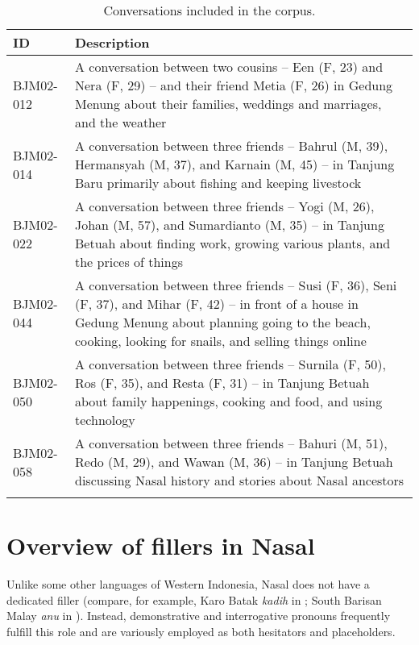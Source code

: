 \documentclass[output=paper,colorlinks,citecolor=brown
\ChapterDOI{10.5281/zenodo.15697585}
]{langscibook}
\begin{document}
\begin{table}
    \caption{Conversations included in the corpus.}
    \label{tab:billings:corpus}
    \begin{tabularx}{1\textwidth}{l X}
        \lsptoprule
        ID         & Description \\
        \midrule
        BJM02-012
        & A conversation between two cousins – Een (F, 23) and Nera (F, 29) – and their friend Metia (F, 26) in Gedung Menung about their families, weddings and marriages, and the weather \\
        BJM02-014
        & A conversation between three friends – Bahrul (M, 39), Hermansyah (M, 37), and Karnain (M, 45) – in Tanjung Baru primarily about fishing and keeping livestock \\
        BJM02-022
        & A conversation between three friends – Yogi (M, 26), Johan (M, 57), and Sumardianto (M, 35) – in Tanjung Betuah about finding work, growing various plants, and the prices of things \\
        BJM02-044
        & A conversation between three friends – Susi (F, 36), Seni (F, 37), and Mihar (F,  42) – in front of a house in Gedung Menung about planning going to the beach, cooking, looking for snails, and selling things online  \\
        BJM02-050
        & A conversation between three friends – Surnila (F, 50), Ros (F, 35), and Resta (F, 31) – in Tanjung Betuah about family happenings, cooking and food, and using technology \\
        BJM02-058
        & A conversation between three friends – Bahuri (M, 51), Redo (M, 29), and Wawan (M, 36) – in Tanjung Betuah discussing Nasal history and stories about Nasal ancestors \\
        \lspbottomrule
    \end{tabularx}
\end{table}

\section{Overview of fillers in Nasal}\label{sec:Fillers}

Unlike some other languages of Western Indonesia, Nasal does not have a dedicated filler (compare, for example, Karo Batak \textit{kadih} in \cite[][118]{woollams_1996}; South Barisan Malay \textit{anu} in \cite{chapters/mcdonnell_billings}). Instead, demonstrative and interrogative pronouns frequently fulfill this role and are variously employed as both hesitators and placeholders.
\end{document}
